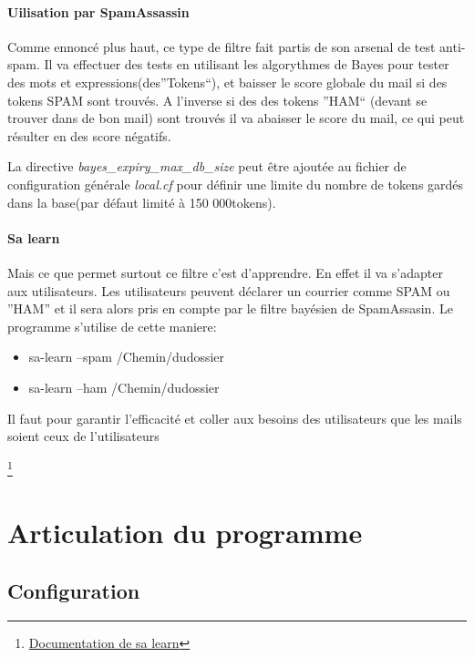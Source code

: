\documentclass[a4paper,11pt]{article}
\begin{document}
\paragraph{Uilisation par SpamAssassin}

Comme ennoncé plus haut, ce type de filtre fait partis de son arsenal de test anti-spam. Il va effectuer des tests 
en utilisant les algorythmes de Bayes pour tester des mots et expressions(des''Tokens``), et baisser le score globale du mail si des tokens SPAM sont trouvés. 
A l'inverse si des des tokens ''HAM`` (devant se trouver dans de bon mail) sont trouvés il va abaisser le score du mail, ce qui peut résulter en
des score négatifs.
\linebreak

La directive \emph{bayes\_expiry\_max\_db\_size} peut être ajoutée au fichier de configuration générale 
\emph{local.cf} pour définir une limite du nombre de tokens gardés dans la base(par défaut limité à 150 000tokens).

\paragraph{Sa learn}
Mais ce que permet surtout ce filtre c'est d'apprendre. En effet il va s'adapter aux utilisateurs. Les utilisateurs
peuvent déclarer un courrier comme SPAM ou ''HAM'' et il sera alors pris en compte par le filtre bayésien de SpamAssasin.
Le programme s'utilise de cette maniere:
\begin{itemize}
 \item sa-learn --spam /Chemin/dudossier
 \item sa-learn --ham /Chemin/dudossier
\end{itemize}
Il faut pour garantir l'efficacité et coller aux besoins des utilisateurs que les mails soient ceux de l'utilisateurs

\footnote{\href{https://spamassassin.apache.org/full/3.1.x/doc/sa-learn.html}{Documentation de sa learn}}



\pagebreak

\section{Articulation du programme}

\subsection{Configuration}
\end{document}
